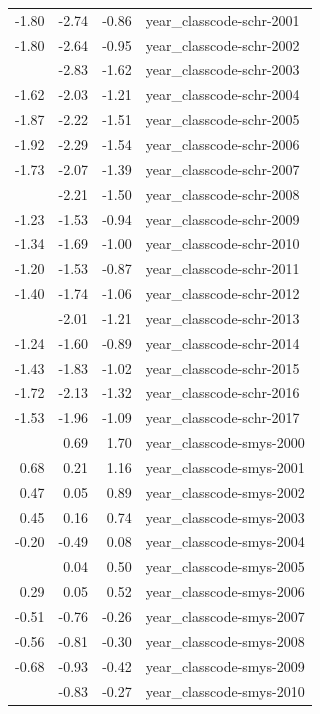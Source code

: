 \documentclass[]{article}
\begin{document}
\begin{longtable}[t]{rrrl}
-1.80 & -2.74 & -0.86 & year\_classcode-schr-2001\\
-1.80 & -2.64 & -0.95 & year\_classcode-schr-2002\\
\addlinespace
-2.23 & -2.83 & -1.62 & year\_classcode-schr-2003\\
-1.62 & -2.03 & -1.21 & year\_classcode-schr-2004\\
-1.87 & -2.22 & -1.51 & year\_classcode-schr-2005\\
-1.92 & -2.29 & -1.54 & year\_classcode-schr-2006\\
-1.73 & -2.07 & -1.39 & year\_classcode-schr-2007\\
\addlinespace
-1.85 & -2.21 & -1.50 & year\_classcode-schr-2008\\
-1.23 & -1.53 & -0.94 & year\_classcode-schr-2009\\
-1.34 & -1.69 & -1.00 & year\_classcode-schr-2010\\
-1.20 & -1.53 & -0.87 & year\_classcode-schr-2011\\
-1.40 & -1.74 & -1.06 & year\_classcode-schr-2012\\
\addlinespace
-1.61 & -2.01 & -1.21 & year\_classcode-schr-2013\\
-1.24 & -1.60 & -0.89 & year\_classcode-schr-2014\\
-1.43 & -1.83 & -1.02 & year\_classcode-schr-2015\\
-1.72 & -2.13 & -1.32 & year\_classcode-schr-2016\\
-1.53 & -1.96 & -1.09 & year\_classcode-schr-2017\\
\addlinespace
1.19 & 0.69 & 1.70 & year\_classcode-smys-2000\\
0.68 & 0.21 & 1.16 & year\_classcode-smys-2001\\
0.47 & 0.05 & 0.89 & year\_classcode-smys-2002\\
0.45 & 0.16 & 0.74 & year\_classcode-smys-2003\\
-0.20 & -0.49 & 0.08 & year\_classcode-smys-2004\\
\addlinespace
0.27 & 0.04 & 0.50 & year\_classcode-smys-2005\\
0.29 & 0.05 & 0.52 & year\_classcode-smys-2006\\
-0.51 & -0.76 & -0.26 & year\_classcode-smys-2007\\
-0.56 & -0.81 & -0.30 & year\_classcode-smys-2008\\
-0.68 & -0.93 & -0.42 & year\_classcode-smys-2009\\
\addlinespace
-0.55 & -0.83 & -0.27 & year\_classcode-smys-2010\\

\end{longtable}
\end{document}
